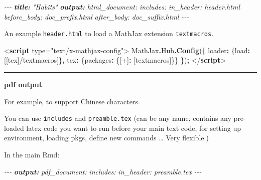 \documentclass[
  a4paper,
  twoside,
  openright]{book}
\newenvironment{Shaded}{\begin{snugshade}}{\end{snugshade}}
\newcommand{\AnnotationTok}[1]{\textcolor[rgb]{0.56,0.35,0.01}{\textbf{\textit{#1}}}}
\newcommand{\AttributeTok}[1]{\textcolor[rgb]{0.13,0.29,0.53}{#1}}
\newcommand{\CommentTok}[1]{\textcolor[rgb]{0.56,0.35,0.01}{\textit{#1}}}
\newcommand{\DataTypeTok}[1]{\textcolor[rgb]{0.13,0.29,0.53}{#1}}
\newcommand{\FunctionTok}[1]{\textcolor[rgb]{0.13,0.29,0.53}{\textbf{#1}}}
\newcommand{\KeywordTok}[1]{\textcolor[rgb]{0.13,0.29,0.53}{\textbf{#1}}}
\newcommand{\NormalTok}[1]{#1}
\newcommand{\OperatorTok}[1]{\textcolor[rgb]{0.81,0.36,0.00}{\textbf{#1}}}
\newcommand{\OtherTok}[1]{\textcolor[rgb]{0.56,0.35,0.01}{#1}}
\newcommand{\StringTok}[1]{\textcolor[rgb]{0.31,0.60,0.02}{#1}}
\theoremstyle{definition}
\theoremstyle{definition}
\theoremstyle{definition}
\theoremstyle{definition}
\theoremstyle{remark}
\begin{document}
\begin{Shaded}
\begin{Highlighting}[]
\CommentTok{{-}{-}{-}}
\AnnotationTok{title:}\CommentTok{ "Habits"}
\AnnotationTok{output:}
\CommentTok{  html\_document:}
\CommentTok{    includes:}
\CommentTok{      in\_header: header.html}
\CommentTok{      before\_body: doc\_prefix.html}
\CommentTok{      after\_body: doc\_suffix.html}
\CommentTok{{-}{-}{-}}
\end{Highlighting}
\end{Shaded}

An example \texttt{header.html} to load a MathJax extension \texttt{textmacros}.

\begin{Shaded}
\begin{Highlighting}[]
\DataTypeTok{\textless{}}\KeywordTok{script}\OtherTok{ type=}\StringTok{"text/x{-}mathjax{-}config"}\DataTypeTok{\textgreater{}}
\NormalTok{  MathJax}\OperatorTok{.}\AttributeTok{Hub}\OperatorTok{.}\FunctionTok{Config}\NormalTok{(\{ }
    \DataTypeTok{loader}\OperatorTok{:}\NormalTok{ \{}\DataTypeTok{load}\OperatorTok{:}\NormalTok{ [}\StringTok{\textquotesingle{}[tex]/textmacros\textquotesingle{}}\NormalTok{]\}}\OperatorTok{,}
    \DataTypeTok{tex}\OperatorTok{:}\NormalTok{ \{}\DataTypeTok{packages}\OperatorTok{:}\NormalTok{ \{}\StringTok{\textquotesingle{}[+]\textquotesingle{}}\OperatorTok{:}\NormalTok{ [}\StringTok{\textquotesingle{}textmacros\textquotesingle{}}\NormalTok{]\}\}}
\NormalTok{  \})}\OperatorTok{;}
\DataTypeTok{\textless{}/}\KeywordTok{script}\DataTypeTok{\textgreater{}}
\end{Highlighting}
\end{Shaded}

\begin{center}\rule{0.5\linewidth}{0.5pt}\end{center}

\textbf{pdf output}

For example, to support Chinese characters.

You can use \texttt{includes} and \texttt{preamble.tex} (can be any name, contains any pre-loaded latex code you want to run before your main text code, for setting up environment, loading pkgs, define new commands \ldots{} Very flexible.)

In the main Rmd:

\begin{Shaded}
\begin{Highlighting}[]
\CommentTok{{-}{-}{-}}
\AnnotationTok{output:}
\CommentTok{  pdf\_document:}
\CommentTok{    includes:}
\CommentTok{      in\_header: preamble.tex}
\CommentTok{{-}{-}{-}}
\end{Highlighting}
\end{Shaded}
\end{document}
